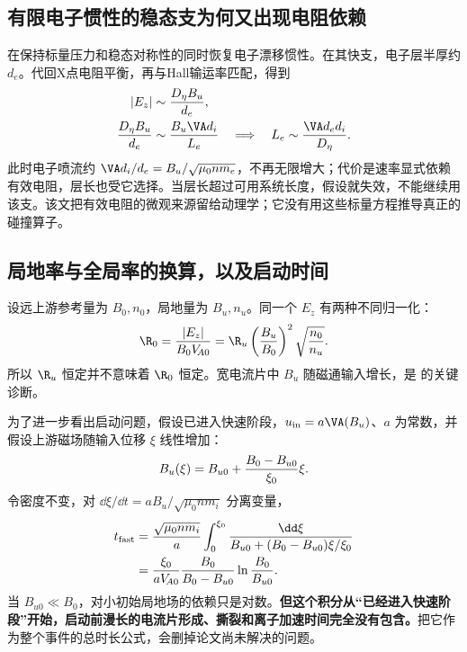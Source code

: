 \subsection{有限电子惯性的稳态支为何又出现电阻依赖}
\citet{Malyshkin2009}在保持标量压力和稳态对称性的同时恢复电子漂移惯性。在其快支，电子层半厚约 $d_e$。代回X点电阻平衡，再与Hall输运率匹配，得到
\begin{align}
|E_z|&\sim {D_\eta B_u\over d_e},\\
{D_\eta B_u\over d_e}&\sim{B_u\VA d_i\over L_e}
\quad\Longrightarrow\quad
L_e\sim {\VA d_ed_i\over D_\eta}.
\end{align}
此时电子喷流约 $\VA d_i/d_e=B_u/\sqrt{\mu_0nm_e}$，不再无限增大；代价是速率显式依赖有效电阻，层长也受它选择。当层长超过可用系统长度，假设就失效，不能继续用该支。该文把有效电阻的微观来源留给动理学；它没有用这些标量方程推导真正的碰撞算子。

\subsection{局地率与全局率的换算，以及启动时间}
设远上游参考量为 $B_0,n_0$，局地量为 $B_u,n_u$。同一个 $E_z$ 有两种不同归一化：
\begin{equation}
\R_0={|E_z|\over B_0V_{\!A0}}
=\R_u\left({B_u\over B_0}\right)^2
\sqrt{n_0\over n_u}.
\end{equation}
所以 $\R_u$ 恒定并不意味着 $\R_0$ 恒定。宽电流片中 $B_u$ 随磁通输入增长，是 \citet{Shay2004} 的关键诊断。

为了进一步看出启动问题，假设已进入快速阶段，$u_{\rm in}=a\VA(B_u)$、$a$ 为常数，并假设上游磁场随输入位移 $\xi$ 线性增加：
\begin{equation}
B_u(\xi)=B_{u0}+{B_0-B_{u0}\over\xi_0}\xi.
\end{equation}
令密度不变，对 $\dd\xi/\dd t=aB_u/\sqrt{\mu_0nm_i}$ 分离变量，
\begin{align}
t_{\rm fast}&={\sqrt{\mu_0nm_i}\over a}
\int_0^{\xi_0}{\dd\xi\over B_{u0}+(B_0-B_{u0})\xi/\xi_0}\\
&={\xi_0\over aV_{\!A0}}{B_0\over B_0-B_{u0}}
\ln{B_0\over B_{u0}}.
\end{align}
当 $B_{u0}\ll B_0$，对小初始局地场的依赖只是对数。\textbf{但这个积分从“已经进入快速阶段”开始，启动前漫长的电流片形成、撕裂和离子加速时间完全没有包含。}把它作为整个事件的总时长公式，会删掉论文尚未解决的问题。

